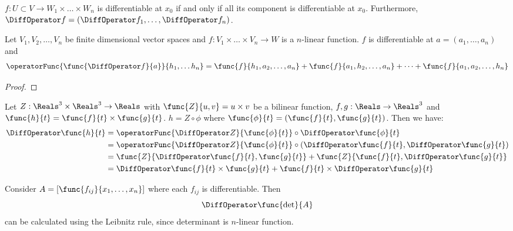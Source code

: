 \begin{proposition}
    \(f : U \subset V \to W_1 \times \dots \times W_n\) is differentiable at \(x_0\) if and only if all its component is differentiable at \(x_0\). Furthermore, \(\DiffOperator f = (\DiffOperator f_1, \dots , \DiffOperator f_n)\).
\end{proposition}

\begin{theorem}
    Let \(V_1, V_2, \dots , V_n\) be finite dimensional vector spaces and \(f: V_1 \times \dots \times V_n \to W\) is a \(n\)-linear function. \(f\) is differentiable at \(a = (a_1, \dots , a_n)\) and
    \begin{equation*}
        \operatorFunc{\func{\DiffOperator f}{a}}{h_1, \dots h_n} = \func{f}{h_1, a_2, \dots, a_n} + \func{f}{a_1, h_2, \dots, a_n} + \dots + \func{f}{a_1, a_2, \dots, h_n}
    \end{equation*}
\end{theorem}

\begin{proof}

\end{proof}

\begin{example}
    Let \(Z: \Reals^3 \times \Reals^3 \to \Reals\) with \(\func{Z}{u,v}= u \times v\) be a bilinear function, \(f,g: \Reals \to \Reals^3\) and \(\func{h}{t} = \func{f}{t} \times \func{g}{t}\). \(h = Z \circ \phi\) where \(\func{\phi}{t} = (\func{f}{t},\func{g}{t})\). Then we have:
    \begin{align*}
        \DiffOperator \func{h}{t} & = \operatorFunc{\DiffOperator Z}{\func{\phi}{t}}\circ \DiffOperator \func{\phi}{t}                             \\
                                  & =  \operatorFunc{\DiffOperator Z}{\func{\phi}{t}} \circ (\DiffOperator \func{f}{t}, \DiffOperator \func{g}{t}) \\
                                  & = \func{Z}{\DiffOperator \func{f}{t}, \func{g}{t}} + \func{Z}{ \func{f}{t}, \DiffOperator \func{g}{t}}         \\
                                  & = \DiffOperator \func{f}{t} \times \func{g}{t} + \func{f}{t} \times \DiffOperator \func{g}{t}
    \end{align*}
\end{example}

\begin{example}
    Consider \(A = [\func{f_{ij}}{x_1, \dots , x_n}]\) where each \(f_{ij}\) is differentiable. Then
    \begin{equation*}
        \DiffOperator \func{\det}{A}
    \end{equation*}
    can be calculated using the Leibnitz rule, since determinant is \(n\)-linear function.
\end{example}

